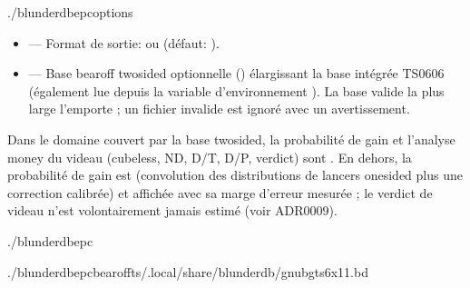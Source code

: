 \documentclass[letterpaper,10pt,french]{sphinxmanual}
\begin{document}
\begin{sphinxVerbatim}[commandchars=\\\{\}]
./blunderdbepc\PYG{o}{[}options\PYG{o}{]}
\end{sphinxVerbatim}

\sphinxAtStartPar
{}
\begin{itemize}
\item {} 
\sphinxAtStartPar
{} — Format de sortie:  ou  (défaut: ).

\item {} 
\sphinxAtStartPar
{} — Base bearoff two\sphinxhyphen{}sided optionnelle () élargissant
la base intégrée TS\sphinxhyphen{}06\sphinxhyphen{}06 (également lue depuis la variable d’environnement
). La base valide la plus large l’emporte ; un fichier
invalide est ignoré avec un avertissement.

\end{itemize}

\sphinxAtStartPar
{} Dans le domaine couvert par la base two\sphinxhyphen{}sided, la probabilité de
gain et l’analyse money du videau (cubeless, ND, D/T, D/P, verdict) sont
. En dehors, la probabilité de gain est  (convolution
des distributions de lancers one\sphinxhyphen{}sided plus une correction calibrée) et
affichée avec sa marge d’erreur mesurée ; le verdict de videau n’est
volontairement jamais estimé (voir ADR\sphinxhyphen{}0009).

\sphinxAtStartPar
{}

\begin{sphinxVerbatim}[commandchars=\\\{\}]
./blunderdbepc

./blunderdbepc\PYGZhy{}\PYGZhy{}bearoff\PYGZhy{}ts\PYGZti{}/.local/share/blunderdb/gnubg\PYGZus{}ts6x11.bd
\end{sphinxVerbatim}
\end{document}
